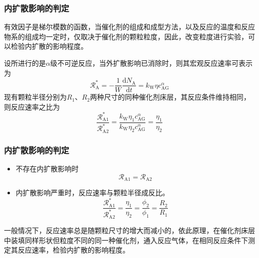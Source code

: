 \begin{frame}
    \frametitle{内扩散影响的判定}

    有效因子是梯尔模数的函数，当催化剂的组成和成型方法，以及反应的温度和反应物系的组成均一定时，仅取决于催化剂的颗粒粒度，因此，改变粒度进行实验，可以检验内扩散的影响程度。

    设所进行的是$\alpha$级不可逆反应，当外扩散影响已消除时，则其宏观反应速率可表示为
    \[
        \mathscr{R}_{\mathrm{A}}^{*}=-\frac{1}{W} \frac{\mathrm{d} N_{\mathrm{A}}}{\mathrm{d} t}=k_{\mathrm{W}} \eta c_\mathrm{AG}^ \alpha
    \]
    现有颗粒半径分别为$R_1$、$R_2$两种尺寸的同种催化剂床层，其反应条件维持相同，则反应速率之比为
    \[
        \frac{\mathscr{R}_{\mathrm{A} 1}^{*}}{\mathscr{R}_{\mathrm{A} 2}^{*}}=\frac{k_{\mathrm{W}} \eta_{1} c_{\mathrm{AG}}^{\alpha}}{k_{\mathrm{W}} \eta_{2} c_{\mathrm{AG}}^{\alpha}}=\frac{\eta_{1}}{\eta_{2}} 
    \]

\end{frame}


\begin{frame}
    \frametitle{内扩散影响的判定}

    \begin{itemize}
        \item 不存在内扩散影响时        
        \[
            \mathscr{R}_{\mathrm{A} 1} = \mathscr{R}_{\mathrm{A} 2}
        \]
        \item 内扩散影响严重时，反应速率与颗粒半径成反比。
        \[
            \frac{\mathscr{R}_{\mathrm{A} 1}^{*}}{\mathscr{R}_{\mathrm{A} 2}^{*}}=\frac{\eta_{1}}{\eta_{2}}=\frac{\phi_{2}}{\phi_{1}}=\frac{R_{2}}{R_{1}}
        \]        
    \end{itemize}
    一般情况下，反应速率总是随颗粒尺寸的增大而减小的，依此原理，在催化剂床层中装填同样形状但粒度不同的同一种催化剂，通入反应气体，在相同反应条件下测定其反应速率，检验内扩散的影响程度。

\end{frame}


